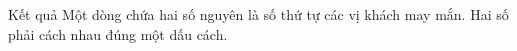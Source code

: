 Kết quả
Một dòng chứa hai số nguyên là số thứ tự các vị khách may mắn. Hai số phải cách nhau đúng một dấu cách.
